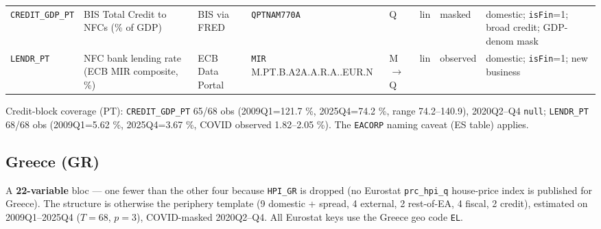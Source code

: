 \begin{longtable}{@{}p{}p{}p{}p{}p{}p{}p{}p{}@{}}
\texttt{CREDIT\_GDP\_PT} & BIS Total Credit to NFCs (\% of GDP) & BIS via FRED & \texttt{QPTNAM770A} & Q & lin & masked & domestic; \texttt{isFin}=1; broad credit; GDP-denom mask \\
\texttt{LENDR\_PT} & NFC bank lending rate (ECB MIR composite, \%) & ECB Data Portal & \texttt{MIR} M.\allowbreak PT.\allowbreak B.\allowbreak A2A.\allowbreak A.\allowbreak R.\allowbreak A.\allowbreak 2240.\allowbreak EUR.\allowbreak N & M$\to$Q & lin & observed & domestic; \texttt{isFin}=1; new business \\
\end{longtable}

\noindent Credit-block coverage (PT): \texttt{CREDIT\_GDP\_PT} 65/68 obs
(2009Q1=121.7 \%, 2025Q4=74.2 \%, range 74.2--140.9), 2020Q2--Q4 \texttt{null};
\texttt{LENDR\_PT} 68/68 obs (2009Q1=5.62 \%, 2025Q4=3.67 \%, COVID observed
1.82--2.05 \%). The \texttt{EACORP} naming caveat (ES table) applies.

\subsection{Greece (GR)}\label{sec:data:GR}

A \textbf{22-variable} bloc --- one fewer than the other four because
\texttt{HPI\_GR} is dropped (no Eurostat \texttt{prc\_hpi\_q} house-price index
is published for Greece). The structure is otherwise the periphery template (9
domestic + spread, 4 external, 2 rest-of-EA, 4 fiscal, 2 credit), estimated on
2009Q1--2025Q4 ($T=68$, $p=3$), COVID-masked 2020Q2--Q4. All Eurostat keys use
the Greece geo code \texttt{EL}.

